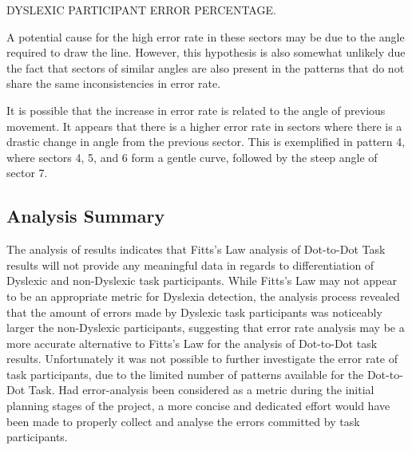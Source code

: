 		DYSLEXIC PARTICIPANT ERROR PERCENTAGE.
		
		A potential cause for the high error rate in these sectors may be due to the angle required to draw the line. However, this hypothesis is also somewhat unlikely due the fact that sectors of similar angles are also present in the patterns that do not share the same inconsistencies in error rate. 
		
		It is possible that the increase in error rate is related to the angle of previous movement. It appears that there is a higher error rate in sectors where there is a drastic change in angle from the previous sector. This is exemplified in pattern 4, where sectors 4, 5, and 6 form a gentle curve, followed by the steep angle of sector 7.
		
	\subsection{Analysis Summary}
		The analysis of results indicates that Fitts’s Law analysis of Dot-to-Dot Task results will not provide any meaningful data in regards to differentiation of Dyslexic and non-Dyslexic task participants. While Fitts’s Law may not appear to be an appropriate metric for Dyslexia detection, the analysis process revealed that the amount of errors made by Dyslexic task participants was noticeably larger the non-Dyslexic participants, suggesting that error rate analysis may be a more accurate alternative to Fitts’s Law for the analysis of Dot-to-Dot task results. Unfortunately it was not possible to further investigate the error rate of task participants, due to the limited number of patterns available for the Dot-to-Dot Task. Had error-analysis been considered as a metric during the initial planning stages of the project, a more concise and dedicated effort would have been made to properly collect and analyse the errors committed by task participants.	
\newpage